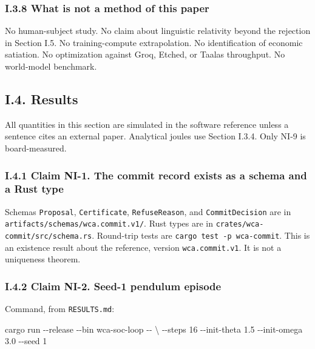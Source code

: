 \documentclass[
  10pt,
]{article}
\newenvironment{Shaded}{}{}
\newcommand{\NormalTok}[1]{#1}
\begin{document}
\subsubsection{I.3.8 What is not a method of this
paper}\label{i.3.8-what-is-not-a-method-of-this-paper}

No human-subject study. No claim about linguistic relativity beyond the
rejection in Section I.5. No training-compute extrapolation. No
identification of economic satiation. No optimization against Groq,
Etched, or Taalas throughput. No world-model benchmark.

\subsection{I.4. Results}\label{i.4.-results}

All quantities in this section are simulated in the software reference
unless a sentence cites an external paper. Analytical joules use Section
I.3.4. Only NI-9 is board-measured.

\subsubsection{I.4.1 Claim NI-1. The commit record exists as a schema
and a Rust
type}\label{i.4.1-claim-ni-1.-the-commit-record-exists-as-a-schema-and-a-rust-type}

Schemas \texttt{Proposal}, \texttt{Certificate}, \texttt{RefuseReason},
and \texttt{CommitDecision} are in
\texttt{artifacts/schemas/wca.commit.v1/}. Rust types are in
\texttt{crates/wca-commit/src/schema.rs}. Round-trip tests are
\texttt{cargo\ test\ -p\ wca-commit}. This is an existence result about
the reference, version \texttt{wca.commit.v1}. It is not a uniqueness
theorem.

\subsubsection{I.4.2 Claim NI-2. Seed-1 pendulum
episode}\label{i.4.2-claim-ni-2.-seed-1-pendulum-episode}

Command, from \texttt{RESULTS.md}:

\begin{Shaded}
\begin{Highlighting}[]
\NormalTok{cargo run {-}{-}release {-}{-}bin wca{-}soc{-}loop {-}{-} \textbackslash{}}
\NormalTok{  {-}{-}steps 16 {-}{-}init{-}theta 1.5 {-}{-}init{-}omega 3.0 {-}{-}seed 1}
\end{Highlighting}
\end{Shaded}
\end{document}
